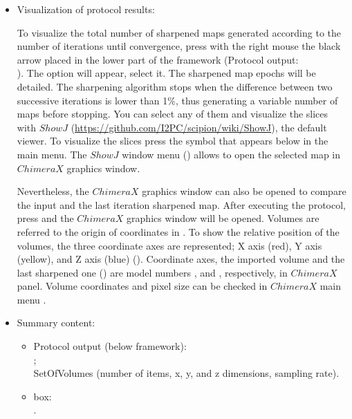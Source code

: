 \begin{itemize}
  \item Visualization of protocol results:
  
  To visualize the total number of sharpened maps generated according to the number of iterations until convergence, press with the right mouse the black arrow placed in the lower part of the \scipion framework (Protocol output:\\ ). The option  will appear, select it. The sharpened map epochs will be detailed. The sharpening algorithm stops when the difference between two successive iterations is lower than 1\%, thus generating a variable number of maps before stopping. You can select any of them and visualize the slices with $ShowJ$ (\url{https://github.com/I2PC/scipion/wiki/ShowJ}), the default \scipion viewer. To visualize the slices press the symbol that appears below  in the main menu. The $ShowJ$ window menu () allows to open the selected map in $ChimeraX$ graphics window.
  
  Nevertheless, the $ChimeraX$ graphics window can also be opened to compare the input and the last iteration sharpened map. After executing the protocol, press  and the $ChimeraX$ graphics window will be opened. Volumes are referred to the origin of coordinates in \chimera. To show the relative position of the volumes, the three coordinate axes are represented; X axis (red), Y axis (yellow), and Z axis (blue) (). Coordinate axes, the imported volume and the last sharpened one () are model numbers ,  and , respectively, in $ChimeraX$  panel. Volume coordinates and pixel size can be checked in $ChimeraX$ main menu . 

  
  
  \item Summary content:
  \begin{itemize}
     \item Protocol output (below \scipion framework):\\ ;\\ SetOfVolumes (number of items, x, y, and z dimensions, sampling rate).
     \item {} box:\\ .
  \end{itemize}
    
\end{itemize}
